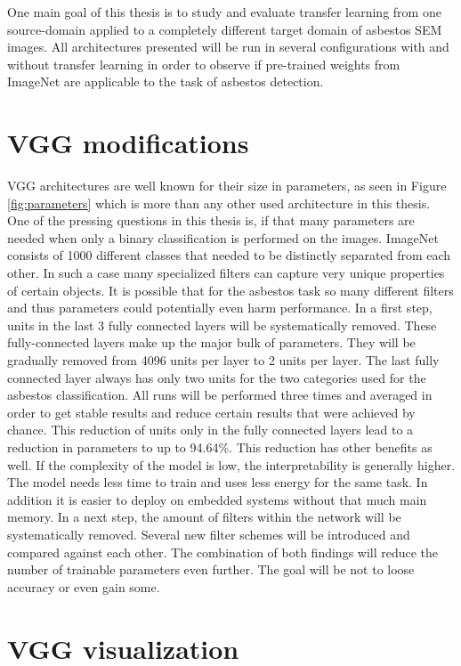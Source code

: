 One main goal of this thesis is to study and evaluate transfer learning from one source-domain applied to a completely different target domain of asbestos SEM images. All architectures presented will be run in several configurations with and without transfer learning in order to observe if pre-trained weights from ImageNet are applicable to the task of asbestos detection.

\section{VGG modifications}

VGG architectures are well known for their size in parameters, as seen in Figure \ref{fig:parameters} which is more than any other used architecture in this thesis. One of the pressing questions in this thesis is, if that many parameters are needed when only a binary classification is performed on the images. ImageNet consists of 1000 different classes that needed to be distinctly separated from each other. In such a case many specialized filters can capture very unique properties of certain objects. It is possible that for the asbestos task so many different filters and thus parameters could  potentially even harm performance. In a first step, units in the last 3 fully connected layers will be systematically removed. These fully-connected layers make up the major bulk of parameters. They will be gradually removed from 4096 units per layer to 2 units per layer. The last fully connected layer always has only two units for the two categories used for the asbestos classification. All runs will be performed  three times  and averaged in order to get stable results and reduce certain results that were achieved by chance.  This reduction of units only in the fully connected layers lead to a reduction in parameters to up to 94.64\%. This reduction has other benefits as well. If the complexity of the model is low, the interpretability is generally higher. The model needs less time to train and uses less energy for the same task.  In addition it is easier to deploy on embedded systems without that much main memory. In a next step, the amount of filters within the network will be systematically removed. Several new filter schemes will be introduced and compared against each other. The combination of both findings will reduce the number of trainable parameters even further. The goal will be not to loose accuracy or even gain some.\\

\section{VGG visualization}

